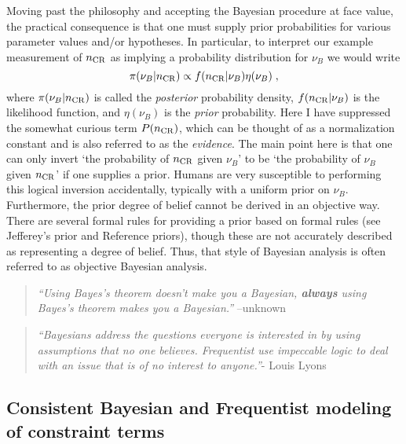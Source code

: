Moving past the philosophy and accepting the Bayesian procedure at face value, the practical consequence is that one must supply prior probabilities for various parameter values and/or hypotheses.  In particular, to interpret our example measurement of $n_{\rm CR}$ as implying a probability distribution for $\nu_B$ we would write
\begin{equation}
\pi(\nu_B | n_{\rm CR}) \propto f(n_{\rm CR} | \nu_B) \eta(\nu_B) \; ,
\end{equation}
where $\pi(\nu_B | n_{\rm CR})$ is called the \textit{posterior} probability density, $f(n_{\rm CR} | \nu_B)$ is the likelihood function, and $\eta(\nu_B)$ is the \textit{prior} probability.  Here I have suppressed the somewhat curious term $P(n_{\rm CR})$, which can be thought of as a normalization constant and is also referred to as the \textit{evidence}.  The main point here is that one can only invert `the probability of $n_{\rm CR}$ given $\nu_B$' to be `the probability of $\nu_B$ given $n_{\rm CR}$' if one supplies a prior.  Humans are very susceptible to performing this logical inversion accidentally, typically with a uniform prior on $\nu_B$.  Furthermore, the prior degree of belief cannot be derived in an objective way.  There are several formal rules for providing a prior based on formal rules (see Jefferey's prior and Reference priors), though these are not accurately described as representing a degree of belief.  Thus, that style of Bayesian analysis is often referred to as objective Bayesian analysis.


{}
\begin{quote}
{\em ``Using Bayes's theorem doesn't make you a Bayesian, \textbf{always} using Bayes's theorem makes you a Bayesian.''} --unknown
\end{quote}
\begin{quote}
{\em
``Bayesians address the questions everyone is interested in by using assumptions that no one believes.
Frequentist use impeccable logic to deal with an issue that is of no interest to anyone.''}- Louis Lyons
\end{quote}


\subsection{Consistent Bayesian and Frequentist modeling of constraint terms}\label{S:Constraint}


